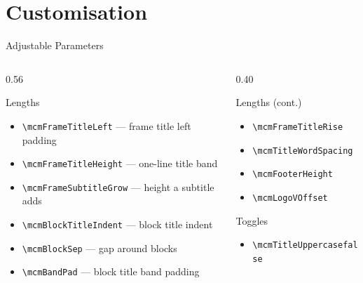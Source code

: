 \documentclass[aspectratio=169]{beamer}
\begin{document}
\section{Customisation}

\begin{frame}{Adjustable Parameters}
  \begin{columns}[T]
    \begin{column}{0.56\textwidth}
      \begin{block}{Lengths}
        \begin{itemize}
          \item \texttt{\textbackslash mcmFrameTitleLeft} — frame title left padding
          \item \texttt{\textbackslash mcmFrameTitleHeight} — one-line title band
          \item \texttt{\textbackslash mcmFrameSubtitleGrow} — height a subtitle adds
          \item \texttt{\textbackslash mcmBlockTitleIndent} — block title indent
          \item \texttt{\textbackslash mcmBlockSep} — gap around blocks
          \item \texttt{\textbackslash mcmBandPad} — block title band padding
        \end{itemize}
      \end{block}
    \end{column}
    \begin{column}{0.40\textwidth}
      \begin{block}{Lengths (cont.)}
        \begin{itemize}
          \item \texttt{\textbackslash mcmFrameTitleRise}
          \item \texttt{\textbackslash mcmTitleWordSpacing}
          \item \texttt{\textbackslash mcmFooterHeight}
          \item \texttt{\textbackslash mcmLogoVOffset}
        \end{itemize}
      \end{block}

      \begin{block}{Toggles}
        \begin{itemize}
          \item \texttt{\textbackslash mcmTitleUppercasefalse}
        \end{itemize}
      \end{block}
    \end{column}
  \end{columns}
\end{frame}
\end{document}
